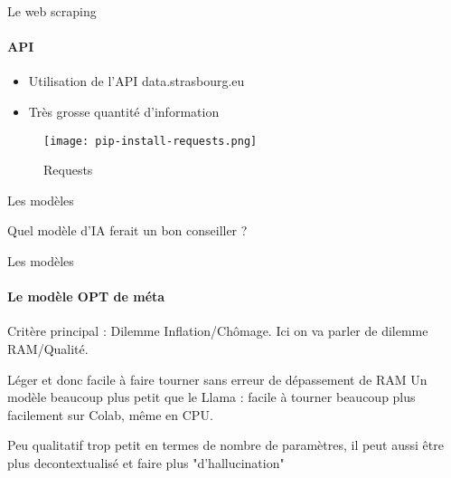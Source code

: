 \documentclass{beamer}
\begin{document}
\begin{frame}{Le web scraping}
\framesubtitle{API}

\begin{itemize}
    \item Utilisation de l’API data.strasbourg.eu
    \item Très grosse quantité d’information
\end{itemize}

\begin{figure}
    \centering
    \texttt{[image: pip-install-requests.png]}
    \caption{Requests}
    \label{fig:enter-label}
\end{figure}
    
\end{frame}


\begin{frame}{Les modèles}

\begin{center}
    \Large Quel modèle d’IA ferait un bon conseiller ?

\end{center}

\end{frame}

\begin{frame}{Les modèles}
\framesubtitle{Le modèle OPT de méta}

Critère principal : Dilemme Inflation/Chômage. Ici on va parler de dilemme RAM/Qualité. 
\vspace{1cm}


\begin{block}{Léger et donc facile à faire tourner sans erreur de dépassement de RAM}
Un modèle beaucoup plus petit que le Llama  : facile  à  tourner beaucoup plus facilement sur Colab, même en CPU.
    
\end{block}

\begin{block}{Peu qualitatif}
trop petit en termes de nombre de paramètres, il peut aussi être plus decontextualisé et faire plus "d'hallucination"
\end{block}
    
\end{frame}
\end{document}
